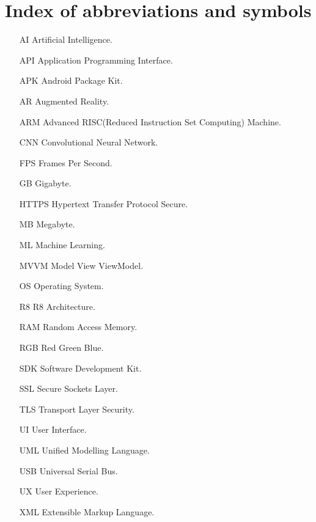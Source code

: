 
\chapter{Index of abbreviations and symbols}

\begin{itemize}
    \item[AI] Artificial Intelligence.
    \item[API] Application Programming Interface.
    \item[APK] Android Package Kit.
    \item[AR] Augmented Reality.
    \item[ARM] Advanced RISC(Reduced Instruction Set Computing) Machine.
    \item[CNN] Convolutional Neural Network.
    \item[FPS] Frames Per Second.
    \item[GB] Gigabyte.
    \item[HTTPS] Hypertext Transfer Protocol Secure.
    \item[MB] Megabyte.
    \item[ML] Machine Learning.
    \item[MVVM] Model View ViewModel.
    \item[OS] Operating System.
    \item[R8] R8 Architecture.
    \item[RAM] Random Access Memory.
    \item[RGB] Red Green Blue.
    \item[SDK] Software Development Kit.
    \item[SSL] Secure Sockets Layer.
    \item[TLS] Transport Layer Security.
    \item[UI] User Interface.
    \item[UML] Unified Modelling Language.
    \item[USB] Universal Serial Bus.
    \item[UX] User Experience.
    \item[XML] Extensible Markup Language.
\end{itemize}    
